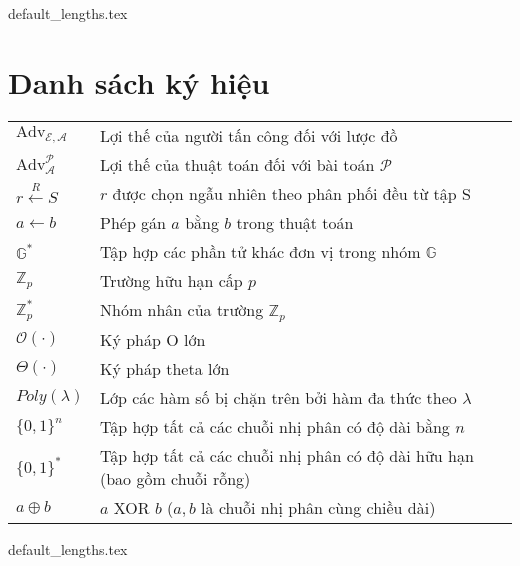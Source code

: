 \documentclass[class=report, crop=false]{standalone}
\begin{document}
	{default_lengths.tex}
	\baselineskip
	\chapter*{Danh sách ký hiệu}
	\begin{longtabu}{>{\large}p{2cm} >{\large}X[l]}
		$\text{Adv}_\mathcal{E, A}$ 			& 	Lợi thế của người tấn công \adversary đối với lược đồ \scheme 							\\
		$\text{Adv}_\mathcal{A}^\mathcal{P}$ 	& 	Lợi thế của thuật toán \algo đối với bài toán $\mathcal{P}$ 							\\
		$r \xleftarrow{R} S$ 					& 	$r$ được chọn ngẫu nhiên theo phân phối đều từ tập S 									\\
		$a \leftarrow b$ 						& 	Phép gán $a$ bằng $b$ trong thuật toán 													\\
		$\mathbb{G}^*$							& 	Tập hợp các phần tử khác đơn vị trong nhóm $\mathbb{G}$ 								\\
		$\mathbb{Z}_p$							& 	Trường hữu hạn cấp $p$ 																\\
		$\mathbb{Z}_p^*$						& 	Nhóm nhân của trường $\mathbb{Z}_p$ 														\\
		$\mathcal{O}(\cdot)$					& 	Ký pháp O lớn																			\\
		$\Theta(\cdot)$							& 	Ký pháp theta lớn																		\\
		$Poly(\lambda)$							& 	Lớp các hàm số bị chặn trên bởi hàm đa thức theo $\lambda$								\\
		$\{0, 1 \}^n$							& 	Tập hợp tất cả các chuỗi nhị phân có độ dài bằng $n$									\\
		$\{0, 1 \}^*$							& 	Tập hợp tất cả các chuỗi nhị phân có độ dài hữu hạn (bao gồm chuỗi rỗng)				\\
		$a \oplus b$							& 	$a$ XOR $b$	($a, b$ là chuỗi nhị phân cùng chiều dài)									\\

	\end{longtabu}
	\newpage
	{default_lengths.tex}
\end{document}
